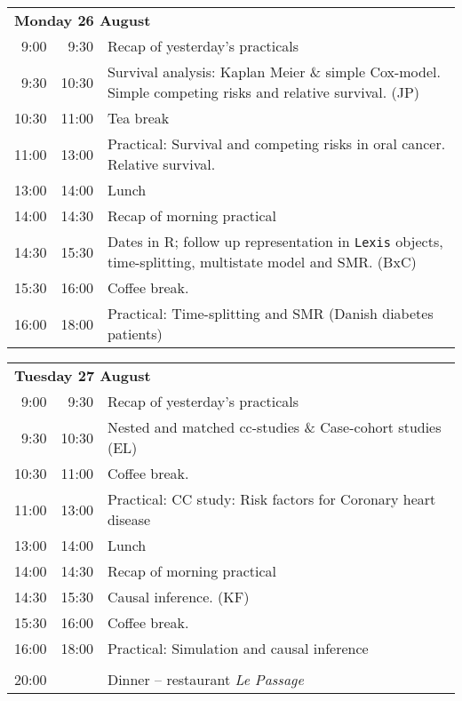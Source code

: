 \noindent
\begin{tabular}{r@{ -- }rp{13cm}}
\multicolumn{3}{l}{\bf Monday 26 August} \\
 9:00 &  9:30 & Recap of yesterday's practicals \\
 9:30 & 10:30 & Survival analysis: Kaplan Meier \& simple
                Cox-model. Simple competing risks and relative
                survival. (JP)\\
10:30 & 11:00 & Tea break\\
11:00 & 13:00 & Practical: Survival and competing risks in oral \newline
                           cancer. Relative survival.\\
13:00 & 14:00 & Lunch \\
14:00 & 14:30 & Recap of morning practical \\
14:30 & 15:30 & Dates in R; follow up representation in \texttt{Lexis} objects,
                time-splitting, multistate model and SMR. (BxC)\\
15:30 & 16:00 & Coffee break. \\
16:00 & 18:00 & Practical: Time-splitting and SMR (Danish diabetes patients)\\[1em]
\end{tabular}

\noindent
\begin{tabular}{r@{ -- }rp{13cm}}
\multicolumn{3}{l}{\bf Tuesday 27 August} \\
 9:00 &  9:30 & Recap of yesterday's practicals \\
 9:30 & 10:30 & Nested and matched cc-studies \& Case-cohort studies (EL) \\
10:30 & 11:00 & Coffee break. \\
11:00 & 13:00 & Practical: CC study: Risk factors for Coronary heart disease\\
13:00 & 14:00 & Lunch \\
14:00 & 14:30 & Recap of morning practical \\
14:30 & 15:30 & Causal inference. (KF)\\
15:30 & 16:00 & Coffee break. \\
16:00 & 18:00 & Practical: Simulation and causal inference\\
      &       & \\
20:00 &       & Dinner -- restaurant {\em Le Passage}\\[1em]
\end{tabular}

